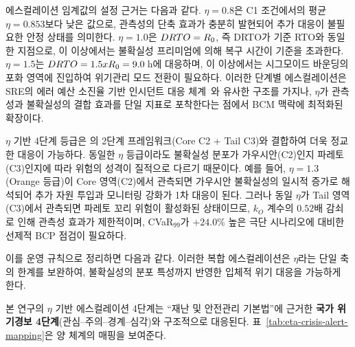 에스컬레이션 임계값의 설정 근거는 다음과 같다.
$\eta = 0.8$은 C1 조건에서의 평균 $\eta = 0.853$보다 낮은 값으로,
관측성의 단축 효과가 충분히 발현되어 추가 대응이 불필요한 안정 상태를 의미한다.
$\eta = 1.0$은 $DRTO = R_0$, 즉 DRTO가 기준 RTO와 동일한 지점으로,
이 이상에서는 불확실성 프리미엄에 의해 복구 시간이 기준을 초과한다.
$\eta = 1.5$는 $DRTO = 1.5 x R_0 = 9.0$\,h에 대응하며,
이 이상에서는 시그모이드 바운딩의 포화 영역에 진입하여
위기관리 모드 전환이 필요하다.
이러한 단계별 에스컬레이션은 SRE의 에러 예산 소진율 기반
인시던트 대응 체계~\citep{beyer2016sre}와 유사한 구조를 가지나,
$\eta$가 관측성과 불확실성의 결합 효과를 단일 지표로 포착한다는 점에서
BCM 맥락에 최적화된 확장이다.

$\eta$ 기반 4단계 등급은 의
2단계 프레임워크(Core C2 + Tail C3)와 결합하여 더욱 정교한 대응이 가능하다.
동일한 $\eta$ 등급이라도 불확실성 분포가 가우시안(C2)인지
파레토(C3)인지에 따라 위험의 성격이 질적으로 다르기 때문이다.
예를 들어, $\eta = 1.3$(Orange 등급)이 Core 영역(C2)에서 관측되면
가우시안 불확실성의 일시적 증가로 해석되어 추가 자원 투입과 모니터링 강화가
1차 대응이 된다. 그러나 동일 $\eta$가 Tail 영역(C3)에서 관측되면
파레토 꼬리 위험이 활성화된 상태이므로, $k_O$ 계수의 $0.52$배 감쇠로 인해
관측성 효과가 제한적이며, CVaR$_{99}$가 $+24.0\%$ 높은 극단 시나리오에
대비한 선제적 BCP 점검이 필요하다.

이를 운영 규칙으로 정리하면 다음과 같다.
이러한 복합 에스컬레이션은 $\eta$라는 단일 축의 한계를 보완하여,
불확실성의 분포 특성까지 반영한 입체적 위기 대응을 가능하게 한다.

본 연구의 $\eta$ 기반 에스컬레이션 4단계는 ``재난 및 안전관리 기본법''에 근거한
\textbf{국가 위기경보 4단계}(관심--주의--경계--심각)와 구조적으로 대응된다.
\p{[}표~\vref{tab:eta-crisis-alert-mapping}\p{]}은 양 체계의 매핑을 보여준다.

